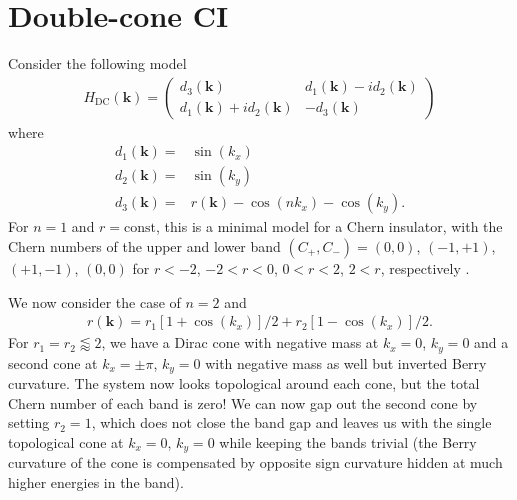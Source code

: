 \documentclass[english]{scrartcl}
\begin{document}
\section{Double-cone CI}
Consider the following model 
\begin{align*}
H_\text{DC}(\bm k) =
\begin{pmatrix}
d_3(\bm k) & d_1(\bm k) - i d_2(\bm k) \\
d_1(\bm k) + i d_2(\bm k) & - d_3(\bm k)
\end{pmatrix}
\end{align*}
where 
\begin{align*}
d_1(\bm k) =& \sin(k_x)\\
d_2(\bm k) =& \sin(k_y)\\
d_3(\bm k) =& r(\bm k) - \cos(n k_x) - \cos(k_y).
\end{align*}
For $n = 1$ and $r = \text{const}$, this is a minimal model for a Chern insulator, with the Chern numbers of the upper and lower band $(C_+, C_-) = (0, 0)$, $(-1, +1)$, $(+1, -1)$, $(0,0)$ for $r < -2$, $-2 <r < 0$, $0 < r < 2$, $2 < r$, respectively \cite{disordered_CI}.

We now consider the case of $n = 2$ and 
\begin{align*}
r(\bm k) = r_1 [1 + \cos(k_x)]/2 + r_2 [1 - \cos(k_x)]/2.
\end{align*}
For $r_1 = r_2  \lessapprox 2$, we have a Dirac cone with negative mass at $k_x = 0$, $k_y = 0$ and a second cone at $k_x = \pm \pi$, $k_y = 0$ with negative mass as well but inverted Berry curvature. The system now looks topological around each cone, but the total Chern number of each band is zero! We can now gap out the second cone by setting $r_2 = 1$, which does not close the band gap and leaves us with the single topological cone at $k_x = 0$, $k_y = 0$ while keeping the bands trivial (the Berry curvature of the cone is compensated by opposite sign curvature hidden at much higher energies in the band). 
\end{document}
